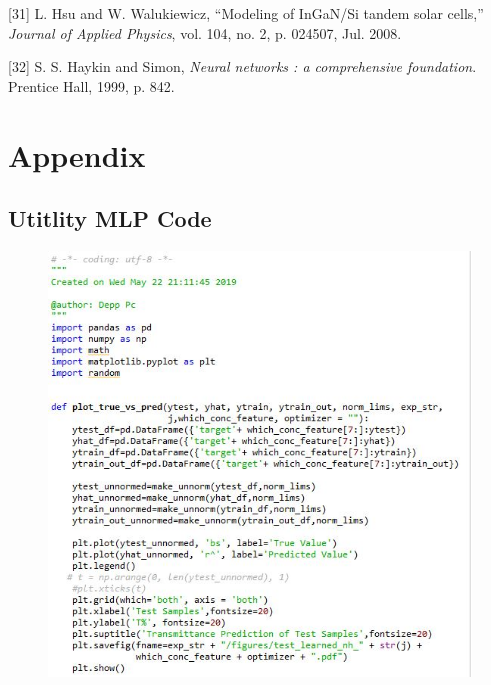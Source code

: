 \documentclass[]{article}
\begin{document}
\leavevmode\hypertarget{ref-Hsu2008}{}%
{[}31{]} L. Hsu and W. Walukiewicz, ``Modeling of InGaN/Si tandem solar cells,'' \emph{Journal of Applied Physics}, vol. 104, no. 2, p. 024507, Jul. 2008.

\leavevmode\hypertarget{ref-Haykin1999}{}%
{[}32{]} S. S. Haykin and Simon, \emph{Neural networks : a comprehensive foundation}. Prentice Hall, 1999, p. 842.

\newpage
{}

\hypertarget{appendix}{%
\section{Appendix }\label{appendix}}



\hypertarget{utitlity-mlp}{%
\subsection{Utitlity MLP Code}\label{utitlity-mlp}}

\begin{figure}
\centering
\includegraphics[width=1\textwidth,height=\textheight]{images/utility1.jpg}
\end{figure}
\end{document}
